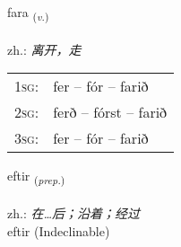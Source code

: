 \documentclass[frontgrid, backgrid]{flacards}\usepackage[]{graphicx}\usepackage[]{xcolor}
\begin{document}
\renewcommand{\flhead}{\vskip5pt \fboxsep=0pt {\small\bfseries\footnotesize Sagnorð | 动词}}
\renewcommand{\fcfoot}{\vskip5pt \fboxsep=0pt \hspace{2pt}{\small\bfseries\footnotesize 1K}}

\renewcommand{\blhead}{\vskip5pt {\small\bfseries\footnotesize Sagnorð | 动词 }}
\renewcommand{\bcfoot}{\vskip5pt \hspace{2pt}{\small\bfseries\footnotesize 1K}}


{fara \small{\textsubscript{(\textit{v.})}} \\[1ex] %
\textphonetic{[faːra]} \\
zh.: \emph{离开，走} \\  [2ex]
\renewcommand*{\arraystretch}{0.8}
\begin{tabular}{p{1cm}l}
\textsc{1sg}: & fer -- fór -- farið \\ 
\textsc{2sg}: & ferð -- fórst -- farið \\ 
\textsc{3sg}: & fer -- fór -- farið \\ 
\end{tabular}
}


\renewcommand{\flhead}{\vskip5pt \fboxsep=0pt {\small\bfseries\footnotesize Forsetning | 介词}}
\renewcommand{\fcfoot}{\vskip5pt \fboxsep=0pt \hspace{2pt}{\small\bfseries\footnotesize 1K}}

\renewcommand{\blhead}{\vskip5pt {\small\bfseries\footnotesize Forsetning | 介词 }}
\renewcommand{\bcfoot}{\vskip5pt \hspace{2pt}{\small\bfseries\footnotesize 1K}}


{eftir \small{\textsubscript{(\textit{prep.})}} \\[1ex]
\textphonetic{[ɛftɪr]} \\
zh.: \emph{在…后；沿着；经过} \\  [2ex]
eftir (Indeclinable)}

\renewcommand{\flhead}{\vskip5pt \fboxsep=0pt {\small\bfseries\footnotesize Sagnorð | 动词}}
\renewcommand{\fcfoot}{\vskip5pt \fboxsep=0pt \hspace{2pt}{\small\bfseries\footnotesize 1K}}
\end{document}
